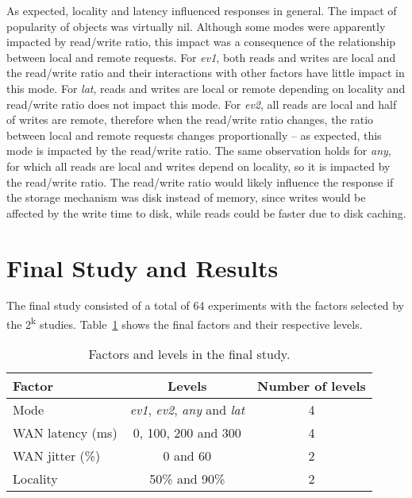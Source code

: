 \documentclass[man,floatsintext,12pt]{apa6}
\begin{document}
As expected, locality and latency influenced responses in general. The impact
of popularity of objects was virtually nil. Although some modes were apparently
impacted by read/write ratio, this impact was a consequence of the relationship
between local and remote requests. For \textit{ev1}, both reads and writes are
local and the read/write ratio and their interactions with other factors have
little impact in this mode. For \textit{lat}, reads and writes are local or
remote depending on locality and read/write ratio does not impact this mode.
For \textit{ev2}, all reads are local and half of writes are remote, therefore
when the read/write ratio changes, the ratio between local and remote requests
changes proportionally -- as expected, this mode is impacted by the read/write
ratio. The same observation holds for \textit{any}, for which all reads are
local and writes depend on locality, so it is impacted by the read/write ratio.
The read/write ratio would likely influence the response if the storage
mechanism was disk instead of memory, since writes would be affected by the
write time to disk, while reads could be faster due to disk caching.

\section{Final Study and Results}

The final study consisted of a total of 64 experiments with the factors
selected by the 2\textsuperscript{k} studies.
Table~\ref{tab:fatores_e_niveis_do_estudo_final} shows the final factors and
their respective levels.

\begin{table}[h!]
\caption{Factors and levels in the final study.}
\begin{tabular}{lcc} \toprule

Factor & Levels & Number of levels\\ \midrule

Mode & \textit{ev1}, \textit{ev2}, \textit{any} and \textit{lat} & 4\\

WAN latency (ms) & 0, 100, 200 and 300 & 4\\

WAN jitter (\%) & 0 and 60 & 2\\

Locality & 50\% and 90\% & 2\\ \bottomrule

\end{tabular}

\label{tab:fatores_e_niveis_do_estudo_final}

\end{table}
\end{document}
